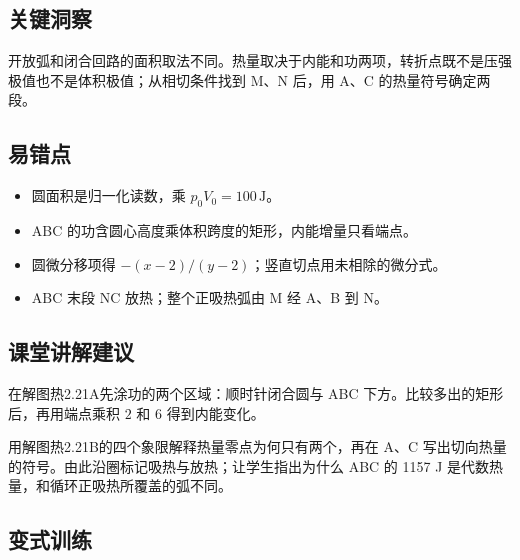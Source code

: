 \documentclass[UTF8,fontset=fandol,a4paper,11pt]{ctexart}
\begin{document}


\subsection*{关键洞察}

开放弧和闭合回路的面积取法不同。热量取决于内能和功两项，转折点既不是压强极值也不是体积极值；从相切条件找到 M、N 后，用 A、C 的热量符号确定两段。



\subsection*{易错点}

\begin{itemize}
\item 圆面积是归一化读数，乘 $p_0V_0=100\,\mathrm J$。
\item ABC 的功含圆心高度乘体积跨度的矩形，内能增量只看端点。
\item 圆微分移项得 $-(x-2)/(y-2)$；竖直切点用未相除的微分式。
\item ABC 末段 NC 放热；整个正吸热弧由 M 经 A、B 到 N。
\end{itemize}



\subsection*{课堂讲解建议}

在解图热2.21A先涂功的两个区域：顺时针闭合圆与 ABC 下方。比较多出的矩形后，再用端点乘积 $2$ 和 $6$ 得到内能变化。

用解图热2.21B的四个象限解释热量零点为何只有两个，再在 A、C 写出切向热量的符号。由此沿圈标记吸热与放热；让学生指出为什么 ABC 的 1157 J 是代数热量，和循环正吸热所覆盖的弧不同。



\subsection*{变式训练}
\end{document}
